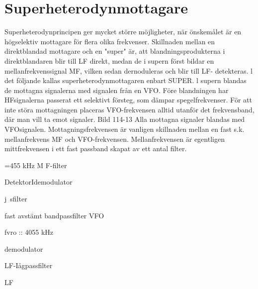 \section{Superheterodynmottagare}

Superheterodynprincipen ger mycket större möjligheter, när önskemålet är en högselektiv mottagare för flera olika frekvenser.
Skillnaden mellan en direktblandad mottagare och en "super" är, att blandningsprodukterna i direktblandaren blir till LF direkt, medan de i supern först bildar en
mellanfrekvenssignal MF, vilken sedan
dernoduleras och blir till LF- detekteras.
l det följande kallas superheterodynmottagaren enbart SUPER. l supern blandas de mottagna signalerna med signalen
från en VFO. Före blandningen har HFsignalerna passerat ett selektivt försteg, som
dämpar spegelfrekvenser. För att inte störa
mottagningen placeras VFO-frekvensen alltid utanför det frekvensband, där man vill ta
emot signaler.
Bild 114-13
Alla mottagna signaler blandas med VFOsignalen. Mottagningsfrekvensen är vanligen skillnaden mellan en fast s.k. mellanfrekvens MF och VFO-frekvensen. Mellanfrekvensen är egentligen mittfrekvensen i
ett fast passband skapat av ett antal filter.

=455 kHz
M F-filter

DetektorIdemodulator

j~sfilter

fast avstämt bandpassfilter
VFO

fvro :: 4055 kHz

demodulator

LF-Iågpassfilter

LF

